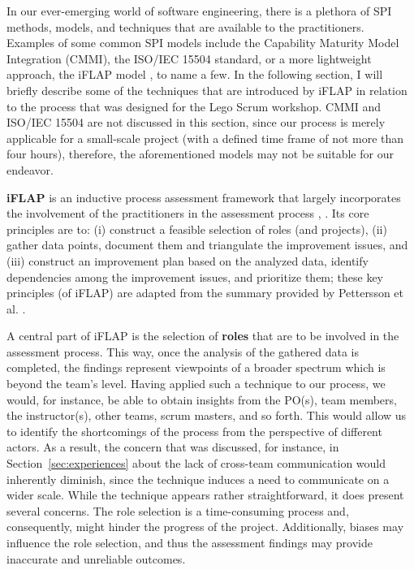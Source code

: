 \documentclass[conference]{IEEEtran}
\begin{document}

In our ever-emerging world of software engineering, there is a plethora of SPI
methods, models, and techniques that are available to the practitioners.
Examples of some common SPI models include the Capability Maturity Model
Integration (CMMI), the ISO/IEC 15504 standard, or a more lightweight approach,
the iFLAP model \cite{Pettersson2008}, to name a few. In the following
section, I will briefly describe some of the techniques that are introduced by
iFLAP in relation to the process that was designed for the Lego Scrum workshop.
CMMI and ISO/IEC 15504 are not discussed in this section, since our process is
merely applicable for a small-scale project (with a defined time frame of not
more than four hours), therefore, the aforementioned models may not be suitable
for our endeavor.

\textbf{{\selectfont iFLAP}} is an inductive process assessment
framework that largely incorporates the involvement of the practitioners in the
assessment process \cite{Pettersson2008}, \cite{Malvius2009}. Its core
principles are to: (i) construct a feasible selection of roles (and projects),
(ii) gather data points, document them and triangulate the improvement issues,
and (iii) construct an improvement plan based on the analyzed data, identify
dependencies among the improvement issues, and prioritize them; these key
principles (of iFLAP) are adapted from the summary provided by Pettersson et
al. \cite{Pettersson2008}.

A central part of iFLAP is the selection of \textbf{roles} that are to be
involved in the assessment process. This way, once the analysis of the gathered
data is completed, the findings represent viewpoints of a broader spectrum
which is beyond the team's level. Having applied such a technique to our
process, we would, for instance, be able to obtain insights from the PO(s),
team members, the instructor(s), other teams, scrum masters, and so forth. This
would allow us to identify the shortcomings of the process from the perspective
of different actors. As a result, the concern that was discussed, for instance,
in Section~\ref{sec:experiences} about the lack of cross-team communication
would inherently diminish, since the technique induces a need to communicate on
a wider scale. While the technique appears rather straightforward, it does
present several concerns. The role selection is a time-consuming process and,
consequently, might hinder the progress of the project. Additionally, biases
may influence the role selection, and thus the assessment findings may provide
inaccurate and unreliable outcomes.
\end{document}
